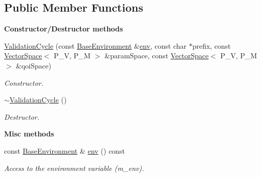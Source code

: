 \subsection*{Public Member Functions}
\begin{Indent}{\bf Constructor/\-Destructor methods}\par
\begin{DoxyCompactItemize}
\item 
\hyperlink{class_q_u_e_s_o_1_1_validation_cycle_abd2447f8ec9a109f2c97b8aa73279cc3}{Validation\-Cycle} (const \hyperlink{class_q_u_e_s_o_1_1_base_environment}{Base\-Environment} \&\hyperlink{class_q_u_e_s_o_1_1_validation_cycle_a64215b434e018a2ef2f4049aa48ecc17}{env}, const char $\ast$prefix, const \hyperlink{class_q_u_e_s_o_1_1_vector_space}{Vector\-Space}$<$ P\-\_\-\-V, P\-\_\-\-M $>$ \&param\-Space, const \hyperlink{class_q_u_e_s_o_1_1_vector_space}{Vector\-Space}$<$ P\-\_\-\-V, P\-\_\-\-M $>$ \&qoi\-Space)
\begin{DoxyCompactList}\small\item\em Constructor. \end{DoxyCompactList}\item 
\hyperlink{class_q_u_e_s_o_1_1_validation_cycle_ac5ba69713d7c3090eb34a431b8238209}{$\sim$\-Validation\-Cycle} ()
\begin{DoxyCompactList}\small\item\em Destructor. \end{DoxyCompactList}\end{DoxyCompactItemize}
\end{Indent}
\begin{Indent}{\bf Misc methods}\par
\begin{DoxyCompactItemize}
\item 
const \hyperlink{class_q_u_e_s_o_1_1_base_environment}{Base\-Environment} \& \hyperlink{class_q_u_e_s_o_1_1_validation_cycle_a64215b434e018a2ef2f4049aa48ecc17}{env} () const 
\begin{DoxyCompactList}\small\item\em Access to the environment variable (m\-\_\-env). \end{DoxyCompactList}\end{DoxyCompactItemize}
\end{Indent}
